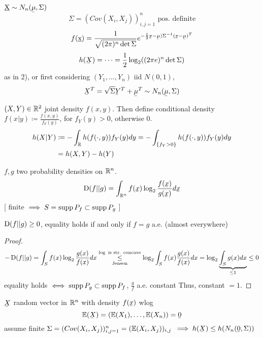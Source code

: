 \documentclass[mfit.tex]{subfiles}
\begin{document}
\begin{ex}
  $\underbar{X} \sim N_n(\ubar{\mu},\Sigma)$
  \[ \Sigma = (Cov(X_i,X_j))_{i,j=1}^n \text{ pos. definite} \]
  \begin{align*}
    f(\underbar{x}) = \frac{1}{\sqrt{(2 \pi)^n \det \Sigma}} e^{- \frac{1}{2} \ubar{x} - \ubar{\mu}) \inv{\Sigma} (\ubar{x} - \ubar{\mu})^T}
  \end{align*}
  \begin{align*}
    h(\ubar{X}) = \dots = \frac{1}{2} \log_2((2 \pi e)^n \det \Sigma)
  \end{align*}
  as in 2), or first considering $(Y_1,\dots,Y_n)$ iid $N(0,1)$,
  \[ \ubar{X}^T = \sqrt{\Sigma} \ubar{Y}^T + \ubar{\mu}^T \sim N_n(\ubar{\mu},\Sigma) \]
\end{ex}

\begin{defi*}
  $(X,Y) \in \mathbb{R}^2$ joint density $f(x,y)$.
  Then define conditional density $f(x|y) \coloneqq \frac{f(x,y)}{f_Y(y)}$, for $f_Y(y) > 0$, otherwise $0$.
  \begin{align*}
    h(X|Y) &\coloneqq - \int_{\mathbb{R}} h(f(\cdot,y)) f_Y(y) dy = - \int_{\{f_Y > 0 \}} h(f(\cdot,y)) f_Y(y) dy \\
    &= h(X,Y) - h(Y)
  \end{align*}
\end{defi*}

\begin{defi*}
  $f,g$ two probability densities on $\mathbb{R}^n$.
  \[ \KLdiv(f||g) = \int_{\R^n} f(\ubar{x}) \log_2 \frac{f(\ubar{x})}{g(\ubar{x})} d \ubar{x} \]
  [ finite $\implies S = \operatorname{supp} P_f \subset \operatorname{supp} P_g$ ]
\end{defi*}

\begin{theorem}
  $\operatorname{D}(f||g) \geq 0$, equality holds if and only if $f = g$ a.e. (almost everywhere)
\end{theorem}

\begin{proof}
  \begin{align*}
    - \operatorname{D}(f||g) = \int_S f(x) \log_2 \frac{g(x)}{f(x)} dx \overset{\log \text{ is str. concave}}{\underset{\text{Jenson}}{\leq}} \log_2 \int_S f(x) \frac{g(x)}{f(x)} dx = \log_2 \underbrace{\int_S g(x) dx}_{\leq 1} \leq 0
  \end{align*}
  equality holds $\iff \operatorname{supp} P_g \subset \operatorname{supp} P_f$,
  $\frac{g}{f}$ a.e. constant
  Thus, constant $=1$.
\end{proof}

\begin{theorem}
  $\ubar{X}$ random vector in $\mathbb{R}^n$ with density $f(\ubar{x})$ wlog
  \[ \expect(\ubar{X}) = (\expect(X_1),\dots,\expect(X_n)) = \ubar{0} \]
  assume finite $\Sigma = (Cov(X_i,X_j))_{i,j=1}^n = (\operatorname{\mathbb{E}}(X_i,X_j))_{i,j}$
  $\implies h(\ubar{X}) \leq h(N_n(\ubar{0},\Sigma))$
\end{theorem}
\end{document}
